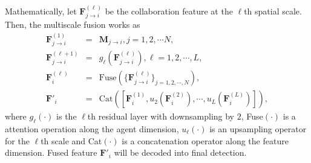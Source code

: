 \documentclass[letterpaper, 10 pt, conference]{ieeeconf}  %
\begin{document}
Mathematically,  let $\mathbf{F}_{j \rightarrow i}^{(\ell)}$ be the collaboration feature at the $\ell$th spatial scale. Then, the multiscale fusion works as 
\begin{subequations}
\begin{eqnarray*}
    \label{eq:fusion_initialization}
    \mathbf{F}_{j \rightarrow i}^{(1)} & = & \mathbf{M}_{j \rightarrow i}, j=1,2,\cdots N,
    \\
    \label{eq:fusion_layer}
    \mathbf{F}_{j \rightarrow i}^{(\ell+1)} & = & g_{\ell}(\mathbf{F}^{(\ell)}_{j \rightarrow i}), \ell=1,2, \cdots,L, 
    \\
    \label{eq:fusion_att}
    \mathbf{F}^{(\ell)}_i & = & \text{Fuse}(\{ \mathbf{F}^{(\ell)}_{j \rightarrow i} \}_{j=1,2, \cdots,N}), 
    \\
    \label{eq:fusion_concat}
    \mathbf{F}'_i & = & \text{Cat}([\mathbf{F}^{(1)}_i, u_2(\mathbf{F}^{(2)}_i),\cdots, u_L(\mathbf{F}^{(L)}_i)]), 
\end{eqnarray*}
\end{subequations}
where $g_{\ell}(\cdot)$ is the $\ell$th residual layer with downsampling by $2$, Fuse$(\cdot)$ is a attention operation along the agent dimension, $u_{\ell}(\cdot)$ is an upsampling operator for the $\ell$th scale and Cat$(\cdot)$ is a concatenation operator along the feature dimension. Fused feature $\mathbf{F}'_i$ will be decoded into final detection.


\end{document}
